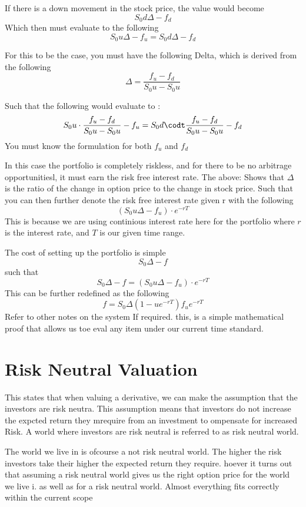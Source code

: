 \documentclass{article}
\theoremstyle{mytheoremstyle}
\theoremstyle{mytheoremstyle}
\theoremstyle{myproblemstyle}
\begin{document}
If there is a down movement in the stock price, the value would become
\[
	S_0d\Delta - f_d
\]
Which then must evaluate to the following
\[
	S_0u\Delta - f_u = S_0d\Delta - f_d
\]

For this to be the case, you must have the following Delta, which is derived from the following
\[
	\Delta = \frac{f_u - f_d}{S_0u- S_0u}
\]

Such that the following would evaluate to :
\[

	S_0u\cdot  \frac{f_u - f_d}{S_0u- S_0u} - f_u = S_0d\codt  \frac{f_u - f_d}{S_0u- S_0u} - f_d
\]
You must know the formulation for both $f_u$ and $f_d$

In this case the portfolio is completely riskless, and for there to be no arbitrage opportunitiesl, it must earn the risk free interest rate.
The above: Shows that $\Delta$ is the ratio of the change in option price to the change in stock price.
Such that you can then further denote the risk free interest rate given r with the following
\[
	(S_0u\Delta - f_u)\cdot e^{-rT}
\]
This is because we are using continious interest rate here for the portfolio where $r$ is the interest rate, and $T$ is our given time range.

The cost of setting up the portfolio is simple
\[
	S_0\Delta - f
\]
such that
\[
	S_0\Delta - f = (S_0u\Delta - f_u) \cdot e^{-rT}
\]
This can be further redefined as the following
\[
	f = S_0\Delta(1 - ue^{-rT}) f_ue^{-rT}
\]
Refer to other notes on the system If required. this, is a simple mathematical proof that allows us toe eval any item under our current time standard.

\section{Risk Neutral Valuation}

This states that when valuing a derivative, we can make the assumption that the investors are risk neutra.
This assumption means that investors do not increase the expcted return they mrequire from an investment to ompensate for increased Risk.
A world where investors are risk neutral is referred to as risk neutral world.


The world we live in is ofcourse a not risk neutral world. The higher the risk investors take their higher the expected return they require. hoever it turns out that assuming a risk neutral world gives us the right option price for the world we live i.
as well as for a risk neutral world. Almost everything fits correctly within the current scope
\end{document}
